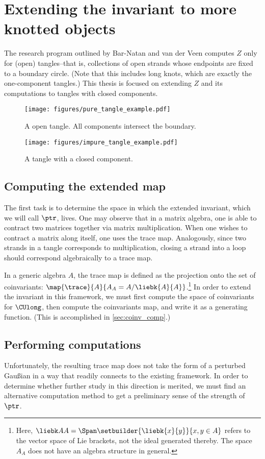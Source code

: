 \section{Extending the invariant to more knotted objects}
The research program outlined by Bar-Natan and van der Veen computes $Z$
only for (open) tangles--that is, collections of open strands whose endpoints
are fixed to a boundary circle. (Note that this includes long knots, which are
exactly the one-component tangles.) This thesis is focused on extending $Z$ and
its computations to tangles with closed components.
\begin{figure}[h]
        \centering
        \texttt{[image: figures/pure\_tangle\_example.pdf]}
        \caption{A open tangle. All components intersect the boundary.}
        \label{fig:open_tangle}
\end{figure}
\begin{figure}[h]
        \centering
        \texttt{[image: figures/impure\_tangle\_example.pdf]}
        \caption{A tangle with a closed component.}
        \label{fig:impure_tangle}
\end{figure}        

\subsection{Computing the extended map}
The first task is to determine the space in which the extended invariant, which
we will call $\ptr$, lives. One may observe that in a matrix algebra, one is
able to contract two matrices together via matrix multiplication. When one
wishes to contract a matrix along itself, one uses the trace map. Analogously,
since two strands in a tangle corresponds to multiplication, closing a strand
into a loop should correspond algebraically to a trace map.

In a generic algebra $A$, the trace map is defined as the projection onto the
set of coinvariants: $\map {\trace} {A} {A_A = A/\liebk{A}{A}}$.\footnote{Here,
$\liebk AA = \Span\setbuilder{\liebk{x}{y}}{x, y\in A}$ refers to the vector
space of Lie brackets, not the ideal generated thereby. The space $A_A$ does not
have an algebra structure in general.} In order to extend the invariant in this
framework, we must first compute the space of coinvariants for $\CUlong$, then
compute the coinvariants map, and write it as a generating function. (This is
accomplished in \cref{sec:coinv_comp}.)

\subsection{Performing computations}
Unfortunately, the resulting trace map does not take the form of a perturbed
Gaußian in a way that readily connects to the existing framework. In order to
determine whether further study in this direction is merited, we must find an
alternative computation method to get a preliminary sense of the strength of
$\ptr$.

